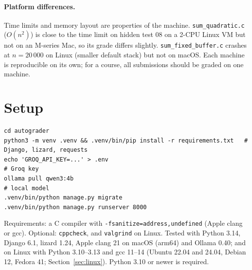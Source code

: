 \documentclass[11pt,a4paper]{article}
\newcommand{\file}[1]{\nolinkurl{#1}}
\begin{document}
\paragraph{Platform differences.} Time limits and memory layout are properties of the machine. \file{sum_quadratic.c}
($O(n^2)$) is close to the time limit on hidden test 08 on a 2-CPU Linux VM but not on an M-series Mac, so its grade
differs slightly. \file{sum_fixed_buffer.c} crashes at $n = 20\,000$ on Linux (smaller default stack) but not on
macOS. Each machine is reproducible on its own; for a course, all submissions should be graded on one machine.

\section{Setup}
\begin{lstlisting}
cd autograder
python3 -m venv .venv && .venv/bin/pip install -r requirements.txt   # Django, lizard, requests
echo 'GROQ_API_KEY=...' > .env                                        # Groq key
ollama pull qwen3:4b                                                  # local model
.venv/bin/python manage.py migrate
.venv/bin/python manage.py runserver 8000
\end{lstlisting}
Requirements: a C compiler with \texttt{-fsanitize=address,undefined} (Apple clang or gcc). Optional:
\texttt{cppcheck}, and \texttt{valgrind} on Linux. Tested with Python 3.14, Django 6.1, lizard 1.24, Apple clang 21 on macOS (arm64)
and Ollama 0.40; and on Linux with Python 3.10--3.13 and gcc 11--14 (Ubuntu 22.04 and 24.04, Debian 12, Fedora 41;
Section~\ref{sec:linux}). Python 3.10 or newer is required.

\appendix
\end{document}
